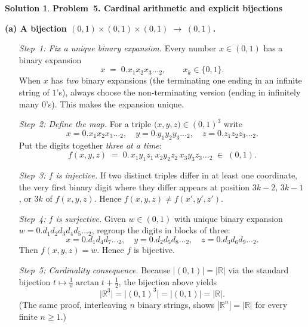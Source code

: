 \documentclass[12pt]{article}
\theoremstyle{definition} %
\newtheorem{solution}{Solution}
\theoremstyle{plain} %
\begin{document}
\begin{solution}
  \textbf{Problem 5. Cardinal arithmetic and explicit bijections}
  
  \medskip
  \textbf{(a)  A bijection \(\displaystyle (0,1)\times(0,1)\times(0,1)\;\longrightarrow\;(0,1)\).}
  
  \begin{enumerate}
      \item[\emph{Step 1:  Fix a unique binary expansion.}]
            Every number \(x\in(0,1)\) has a binary expansion
            \[
                x \;=\; 0.x_{1}x_{2}x_{3}\dots_{\!2},
                \qquad x_{k}\in\{0,1\}.
            \]
            When \(x\) has \emph{two} binary expansions (the terminating one
            ending in an infinite string of \(1\)’s), always choose the
            non‑terminating version (ending in infinitely many \(0\)’s).
            This makes the expansion unique.
  
      \item[\emph{Step 2:  Define the map.}]
            For a triple \(\bigl(x,y,z\bigr)\in(0,1)^{3}\) write
            \[
                x=0.x_1x_2x_3\dots_{\!2},\quad
                y=0.y_1y_2y_3\dots_{\!2},\quad
                z=0.z_1z_2z_3\dots_{\!2}.
            \]
            Put the digits together \emph{three at a time}:
            \[
                f(x,y,z)
                \;=\;
                0.\,x_1y_1z_1\,x_2y_2z_2\,x_3y_3z_3\dots_{\!2}
                \;\in\;(0,1).
            \]
  
      \item[\emph{Step 3:  \(f\) is injective.}]
            If two distinct triples differ in at least one coordinate, the
            very first binary digit where they differ appears at position
            \(3k-2,\,3k-1\), or \(3k\) of \(f(x,y,z)\).  Hence
            \(f(x,y,z)\neq f(x',y',z')\).
  
      \item[\emph{Step 4:  \(f\) is surjective.}]
            Given \(w\in(0,1)\) with unique binary expansion
            \( w=0.d_{1}d_{2}d_{3}d_{4}d_{5}\dots_{\!2}\),
            regroup the digits in blocks of three:
            \[
                x=0.d_{1}d_{4}d_{7}\dots_{\!2},\quad
                y=0.d_{2}d_{5}d_{8}\dots_{\!2},\quad
                z=0.d_{3}d_{6}d_{9}\dots_{\!2}.
            \]
            Then \(f(x,y,z)=w\).  Hence \(f\) is bijective.
  
      \item[\emph{Step 5:  Cardinality consequence.}]
            Because \(\bigl|(0,1)\bigr|=\bigl|\mathbb{R}\bigr|\) via the
            standard bijection \(t\mapsto\frac{1}{\pi}\arctan t+\tfrac12\),
            the bijection above yields
            \[
                \bigl|\mathbb{R}^{3}\bigr|
                =\bigl|(0,1)^{3}\bigr|
                =\bigl|(0,1)\bigr|
                =\bigl|\mathbb{R}\bigr|.
            \]
            (The same proof, interleaving \(n\) binary strings, shows
            \(|\mathbb{R}^{n}|=|\mathbb{R}|\) for every finite \(n\ge 1\).)
  \end{enumerate}
  

\end{solution}
\end{document}
